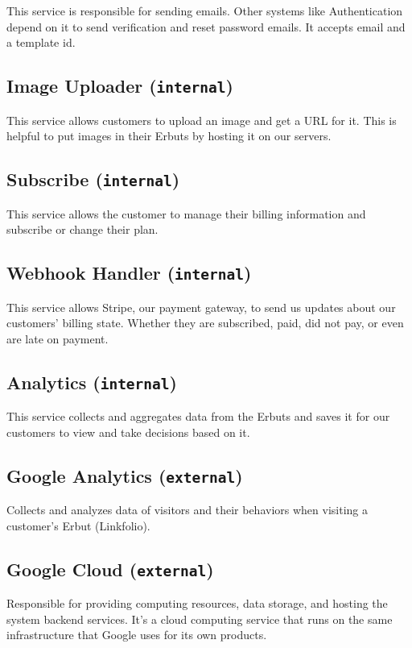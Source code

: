\documentclass{article}
\begin{document}
This service is responsible for sending emails. Other systems like Authentication depend on it to send verification and reset password emails. It accepts email and a template id.

\subsection{Image Uploader (\texttt{internal})}

This service allows customers to upload an image and get a URL for it. This is helpful to put images in their Erbuts by hosting it on our servers.

\subsection{Subscribe (\texttt{internal})}

This service allows the customer to manage their billing information and subscribe or change their plan.

\subsection{Webhook Handler (\texttt{internal})}

This service allows Stripe, our payment gateway, to send us updates about our customers' billing state. Whether they are subscribed, paid, did not pay, or even are late on payment.

\subsection{Analytics (\texttt{internal})}

This service collects and aggregates data from the Erbuts and saves it for our customers to view and take decisions based on it.

\subsection{Google Analytics (\texttt{external})}

Collects and analyzes data of visitors and their behaviors when visiting a customer’s Erbut (Linkfolio).

\subsection{Google Cloud (\texttt{external})}

Responsible for providing computing resources, data storage, and hosting the system backend services. It’s a cloud computing service that runs on the same infrastructure that Google uses for its own products.
\end{document}
